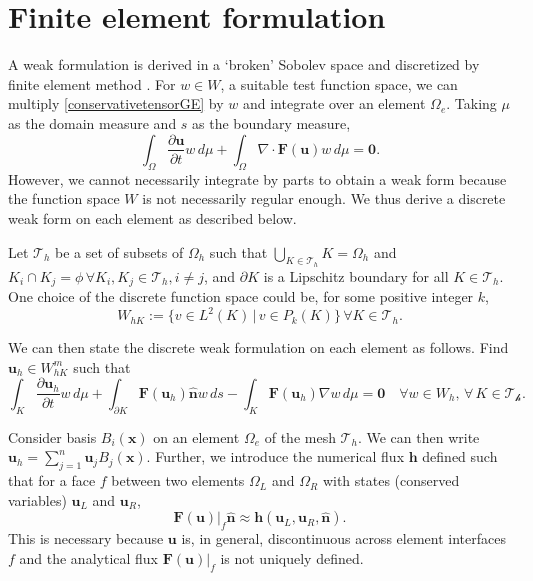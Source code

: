 \documentclass[11pt]{article}
\let\bld\boldsymbol
\begin{document}
\section{Finite element formulation}

A weak formulation is derived in a `broken' Sobolev space and discretized by finite element method \cite{luo_taylor}. For $w \in W$, a suitable test function space, we can multiply \eqref{conservativetensorGE} by $w$ and integrate over an element $\Omega_e$. Taking $\mu$ as the domain measure and $s$ as the boundary measure,
\begin{equation}
\int_{\Omega} \frac{\partial\bld{u}}{\partial t}w\,d\mu + \int_{\Omega}\nabla\cdot\bld{F(\bld{u})}w \,d\mu = \bld{0}.
\end{equation}
However, we cannot necessarily integrate by parts to obtain a weak form because the function space $W$ is not necessarily regular enough. We thus derive a discrete weak form on each element as described below.

Let $\mathcal{T}_h$ be a set of subsets of $\Omega_h$ such that $\bigcup_{K\in \mathcal{T}_h}K = \Omega_h$ and $K_i \cap K_j = \phi \, \forall K_i, K_j \in \mathcal{T}_h, i \neq j$, and $\partial K$ is a Lipschitz boundary for all $K \in \mathcal{T}_h$. One choice of the discrete function space could be, for some positive integer $k$,
\begin{equation}
W_{hK} := \{ v \in L^2(K)\, |\, v \in P_k(K) \} \,\forall K \in \mathcal{T}_h.
\end{equation}

We can then state the discrete weak formulation on each element as follows. Find $\bld{u}_h \in W_{hK}^m$ such that
\begin{equation}
\int_{K} \frac{\partial\bld{u}_h}{\partial t}w\,d\mu + \int_{\partial K} \bld{F}(\bld{u}_h)\hat{\bld{n}}w \,ds - \int_{K}\bld{F}(\bld{u}_h)\nabla w \,d\mu = \bld{0} \quad \forall w \in W_h,\, \forall \,K \in \mathcal{T_h}.
\label{wf}
\end{equation}

Consider basis $B_i(\bld{x})$ on an element $\Omega_e$ of the mesh $\mathcal{T}_h$. We can then write $\bld{u}_h = \sum_{j=1}^n \bld{u}_j B_j(\bld{x})$. Further, we introduce the numerical flux $\bld{h}$ defined such that for a face $f$ between two elements $\Omega_L$ and $\Omega_R$ with states (conserved variables) $\bld{u}_L$ and $ \bld{u}_R$,
\begin{equation}
\bld{F}(\bld{u})|_f\hat{\bld{n}} \approx \bld{h}(\bld{u}_L, \bld{u}_R, \hat{\bld{n}}).
\end{equation}
This is necessary because $\bld{u}$ is, in general, discontinuous across element interfaces $f$ and the analytical flux $\bld{F}(\bld{u})|_f$ is not uniquely defined.
\end{document}
